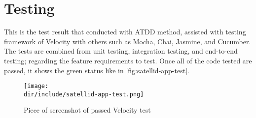 \clearpage
\section{Testing}
\label{sec:testing}

This is the test result that conducted with \ac{ATDD} method, assisted with testing framework of Velocity with others such as Mocha, Chai, Jasmine, and Cucumber.
The tests are combined from unit testing, integration testing, and end-to-end testing; regarding the feature requirements to test.
Once all of the code tested are passed, it shows the green status like in \autoref{fig:satellid-app-test}.

\begin{figure}[htb]
  \centering
  \texttt{[image: \\dir/include/satellid-app-test.png]}
  \caption{Piece of screenshot of passed Velocity test}
  \label{fig:satellid-app-test}
\end{figure}
